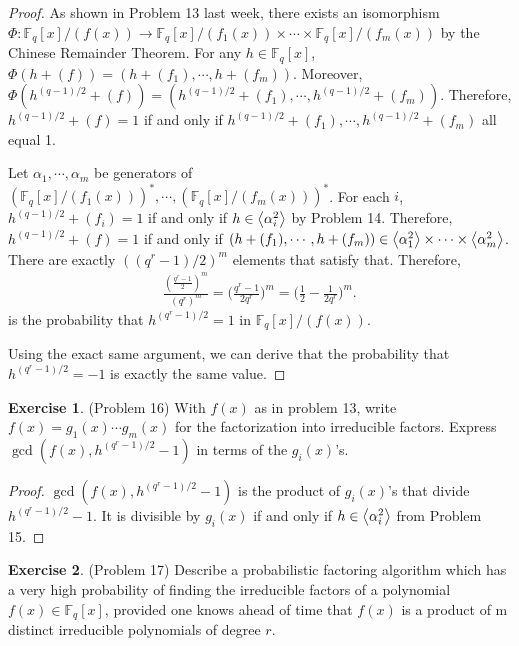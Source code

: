 \documentclass[12pt, psamsfonts]{amsart}
\theoremstyle{definition}
\newtheorem*{exer}{Exercise}
\theoremstyle{remark}
\numberwithin{equation}{section}
\begin{document}
\begin{proof}
  As shown in Problem 13 last week, there exists an isomorphism $\Phi: \mathbb{F}_q[x]/(f(x)) \rightarrow \mathbb{F}_q[x]/(f_1(x)) \times \cdots \times \mathbb{F}_q[x]/(f_m(x))$ by the Chinese Remainder Theorem.
  For any $h \in \mathbb{F}_q[x]$, $\Phi(h + (f)) = (h + (f_1), \cdots, h + (f_m))$.
  Moreover, $\Phi(h^{(q - 1)/2} + (f)) = (h^{(q - 1)/2} + (f_1), \cdots, h^{(q - 1)/2} + (f_m))$.
  Therefore, $h^{(q - 1)/2} + (f) = 1$ if and only if $h^{(q - 1)/2} + (f_1), \cdots, h^{(q - 1)/2} + (f_m)$ all equal 1.

  Let $\alpha_1, \cdots, \alpha_m$ be generators of $(\mathbb{F}_q[x]/(f_1(x)))^*, \cdots, (\mathbb{F}_q[x]/(f_m(x)))^*$.
  For each $i$, $h^{(q - 1)/2} + (f_i) = 1$ if and only if $h \in \ev{ \alpha_i^2 }$ by Problem 14.
  Therefore, $h^{(q - 1)/2} + (f) = 1$ if and only if $(h + (f_1), \cdots, h + (f_m)) \in \ev{ \alpha_1^2 } \times \cdots \times \ev{ \alpha_m^2 }$.
  There are exactly $((q^r - 1)/2)^m$ elements that satisfy that.
  Therefore,
  \begin{align*}
    \frac{(\frac{q^r - 1}{2})^m}{(q^r)^m} = \Big(\frac{q^r - 1}{2q^r}\Big)^m = \Big(\frac{1}{2} - \frac{1}{2q^r}\Big)^m.
  \end{align*}
  is the probability that $h^{(q^r - 1)/2} = 1$ in $\mathbb{F}_q[x]/(f(x))$.

  Using the exact same argument, we can derive that the probability that $h^{(q^r - 1)/2} = -1$ is exactly the same value.
\end{proof}

\begin{exer}{(Problem 16)}
  With $f(x)$ as in problem 13, write $f(x) = g_1(x) \cdots g_m(x)$ for the factorization into irreducible factors.
  Express $\gcd(f(x), h^{(q^r - 1)/2} - 1)$ in terms of the $g_i(x)$'s.
\end{exer}

\begin{proof}
  $\gcd(f(x), h^{(q^r - 1)/2} - 1)$ is the product of $g_i(x)$'s that divide $h^{(q^r - 1)/2} - 1$.
  It is divisible by $g_i(x)$ if and only if $h \in \ev{ \alpha_i^2 }$ from Problem 15.
\end{proof}

\begin{exer}{(Problem 17)}
  Describe a probabilistic factoring algorithm which has a very high probability of finding the irreducible factors of a polynomial $f(x) \in \mathbb{F}_q[x]$, provided one knows ahead of time that $f(x)$ is a product of m distinct irreducible polynomials of degree $r$.
\end{exer}
\end{document}
